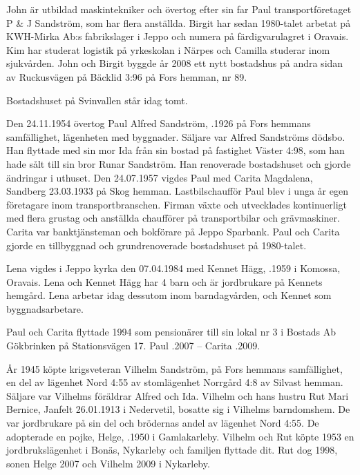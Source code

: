 
John är utbildad maskintekniker och övertog efter sin far Paul transportföretaget P \& J Sandström, som har flera anställda. Birgit har sedan 1980-talet arbetat på KWH-Mirka Ab:s fabrikslager i Jeppo och numera på färdigvarulagret i Oravais. Kim har studerat logistik på yrkeskolan i Närpes och Camilla studerar inom sjukvården. John och Birgit byggde år 2008 ett nytt bostadshus på andra sidan av Ruckusvägen på Bäcklid 3:96 på Fors hemman, nr 89.

Bostadshuset på Svinvallen står idag tomt.



Den 24.11.1954 övertog Paul Alfred Sandström, .1926 på Fors hemmans samfällighet, lägenheten med byggnader. Säljare var Alfred Sandströms dödsbo. Han flyttade med sin mor Ida från sin bostad på fastighet Väster 4:98, som han hade sålt till sin bror Runar Sandström. Han renoverade bostadshuset och gjorde ändringar i uthuset. Den 24.07.1957 vigdes Paul med Carita Magdalena, \textborn Sandberg 23.03.1933 på Skog hemman. Lastbilschaufför Paul blev i unga år egen företagare inom transportbranschen. Firman växte och utvecklades kontinuerligt med flera grustag och anställda chaufförer på transportbilar och grävmaskiner. Carita var banktjänsteman och bokförare på Jeppo Sparbank. Paul och Carita gjorde en tillbyggnad och grundrenoverade bostadshuset på 1980-talet.
\begin{jhchildren}
  \item {}
  \item {}
\end{jhchildren}
Lena vigdes i Jeppo kyrka den 07.04.1984 med Kennet Hägg, .1959 i Komossa, Oravais. Lena och Kennet Hägg har 4 barn och är jordbrukare på Kennets hemgård. Lena arbetar idag dessutom inom barndagvården, och Kennet som byggnadsarbetare.

Paul och Carita flyttade 1994 som pensionärer till sin lokal nr 3 i Bostads Ab Gökbrinken på Stationsvägen 17.
Paul .2007  --  Carita .2009.



År 1945 köpte krigsveteran Vilhelm Sandström,  på Fors hemmans samfällighet, en del av lägenhet Nord 4:55 av stomlägenhet Norrgård 4:8 av Silvast hemman. Säljare var Vilhelms föräldrar Alfred och Ida. Vilhelm och hans hustru Rut Mari Bernice, \textborn Janfelt 26.01.1913 i Nedervetil, bosatte sig i Vilhelms barndomshem. De var jordbrukare på sin del och brödernas andel av lägenhet Nord 4:55. De adopterade en pojke, Helge, .1950 i Gamlakarleby. Vilhelm och Rut köpte 1953 en jordbrukslägenhet i Bonäs, Nykarleby och familjen flyttade dit. Rut dog 1998, sonen Helge 2007 och Vilhelm 2009 i Nykarleby.

